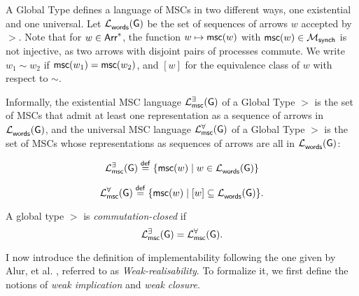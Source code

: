 A Global Type defines a language of MSCs in two different ways, one
existential and one universal. Let $\mathcal{L}_{\mathsf{words}}^{}(\mathsf{G})$ be the set of
sequences of arrows $w$ accepted by $\gt$. Note that for $w \in \mathsf{Arr}^*$,
the function $w \mapsto \mathsf{msc}(w)$ with
$\mathsf{msc}(w) \in \mathcal{M}_{\mathsf{synch}}$ is not injective, as two
arrows with disjoint pairs of processes commute. We write $w_1 \sim w_2$ if
$\mathsf{msc}(w_1) = \mathsf{msc}(w_2)$, and $[w]$ for the equivalence class
of $w$ with respect to $\sim$.

Informally, the existential MSC language $\mathcal{L}_{\mathsf{msc}}^{\exists}(\mathsf{G}){}$ of a 
Global Type $\gt$ is the set of MSCs that admit at least one representation as a
sequence of arrows in $\mathcal{L}_{\mathsf{words}}^{}(\mathsf{G})$, and the universal MSC
language $\universalmsclanguageof{\gt}$ of a Global Type $\gt$ is the set of
MSCs whose representations as sequences of arrows are all in
$\mathcal{L}_{\mathsf{words}}^{}(\mathsf{G})$:

\bigskip

\begin{definition}[$\existentialmsclanguageof{\gt}$]
	$$
		\mathcal{L}_{\mathsf{msc}}^{\exists}(\mathsf{G}) \stackrel{\mathsf{def}}{=} \{\mathsf{msc}(w) \mid
		w \in \mathcal{L}_{\mathsf{words}}^{}(\mathsf{G})\}
  $$
\end{definition}

\bigskip

\begin{definition}[$\universalmsclanguageof{\gt}$]
  $$
		\mathcal{L}_{\mathsf{msc}}^{\forall}(\mathsf{G}) \stackrel{\mathsf{def}}{=} \{\mathsf{msc}(w) \mid
		[w] \subseteq \mathcal{L}_{\mathsf{words}}^{}(\mathsf{G})\}.
	$$
\end{definition}

\bigskip

\begin{definition}
    A global type $\gt$ is \emph{commutation-closed} if
    $$
    \mathcal{L}_{\mathsf{msc}}^{\exists}(\mathsf{G}) = \mathcal{L}_{\mathsf{msc}}^{\forall}(\mathsf{G}).
    $$
\end{definition}

I now introduce the definition of implementability following the one given 
by Alur, et al. \cite{alur2005realizability}, referred to as 
\textit{Weak-realisability}.
To formalize it, we first define the notions of 
\textit{weak implication} and \textit{weak closure}.

